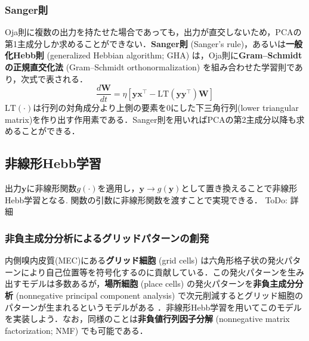 \subsubsection{Sanger則}
Oja則に複数の出力を持たせた場合であっても，出力が直交しないため，PCAの第1主成分しか求めることができない．\textbf{Sanger則} (Sanger's rule)，あるいは\textbf{一般化Hebb則} (generalized Hebbian algorithm; GHA) は，Oja則に\textbf{Gram–Schmidtの正規直交化法} (Gram–Schmidt orthonormalization) を組み合わせた学習則であり，次式で表される．
\begin{equation}
\frac{d\mathbf{W}}{dt} = \eta \left[\mathbf{y}\mathbf{x}^\top - \mathrm{LT}\left(\mathbf{y}\mathbf{y}^\top\right) \mathbf{W}\right]
\end{equation}
$\mathrm{LT}(\cdot)$は行列の対角成分より上側の要素を0にした下三角行列(lower triangular matrix)を作り出す作用素である．Sanger則を用いればPCAの第2主成分以降も求めることができる．
\subsection{非線形Hebb学習}
出力$\mathbf{y}$に非線形関数$g(\cdot)$を適用し，$\mathbf{y}\to g(\mathbf{y})$として置き換えることで非線形Hebb学習となる\citep{Oja1997-hr}\citep{Brito2016-mx}. 関数の引数に非線形関数を渡すことで実現できる．
ToDo: 詳細
\subsubsection{非負主成分分析によるグリッドパターンの創発}
内側嗅内皮質(MEC)にある\textbf{グリッド細胞} (grid cells) は六角形格子状の発火パターンにより自己位置等を符号化するのに貢献している．この発火パターンを生み出すモデルは多数あるが，\textbf{場所細胞} (place cells) の発火パターンを\textbf{非負主成分分析} (nonnegative principal component analysis) で次元削減するとグリッド細胞のパターンが生まれるというモデルがある \citep{Dordek2016-ff}．非線形Hebb学習を用いてこのモデルを実装しよう．なお，同様のことは\textbf{非負値行列因子分解} (nonnegative matrix factorization; NMF) でも可能である．
